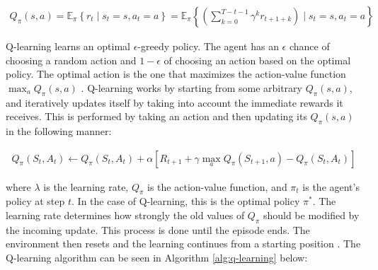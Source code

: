\begin{gather}
    Q_{\pi}(s, a)=\mathbb{E}_{\pi}\left\{r_{t} \mid s_{t}=s, a_{t}=a\right\}=\mathbb{E}_{\pi}\left\{\left(\sum_{k=0}^{T-t-1} \gamma^{k} r_{t+1+k}\right) \mid s_{t}=s, a_{t}=a\right\}
    
    \label{eu_q_learning}
\end{gather}

Q-learning learns an optimal $\epsilon$-greedy policy. The agent has an $\epsilon$ chance of choosing a random action and $1-\epsilon$ of choosing an action based on the optimal policy. The optimal action is the one that maximizes the action-value function $\max _{a} Q_{\pi}(s, a)$ . 
Q-learning works by starting from some arbitrary $Q_\pi(s,a)$, 
and iteratively updates itself by taking into account the immediate rewards it receives. This is performed by taking an action and then updating its $Q_\pi(s,a)$ 
in the following manner:

\begin{gather}
   Q_{\pi}\left(S_{t}, A_{t}\right) \leftarrow Q_{\pi}\left(S_{t}, A_{t}\right)+\alpha\left[R_{t+1}+\gamma \max _{a} Q_{\pi}\left(S_{t+1}, a\right)-Q_{\pi}\left(S_{t}, A_{t}\right)\right]
   \label{eu_q_learning_policy}
\end{gather}


where $\lambda$ is the learning rate, $Q_\pi$ is the action-value function, and $\pi_t$ is the agent’s policy at step $t$. In the case of Q-learning, this is the optimal policy $\pi^*$. The learning rate determines how strongly the old values of $Q_\pi$ should be modified by the incoming update. This process is done until the episode ends. The environment then resets and the learning continues from a starting position \cite{sutton2018reinforcement}. The Q-learning algorithm can be seen in Algorithm \ref{alg:q-learning} below:



